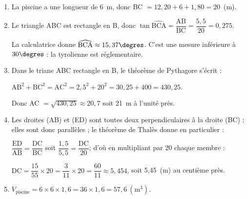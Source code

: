 \begin{enumerate}
\item %
La piscine a une longueur de 6~m, donc BC $= 12,20 + 6 + 1,80 = 20$~(m).
\item %
Le triangle ABC est rectangle en B, donc $\tan \widehat{\text{BCA}} = \dfrac{\text{AB}}{\text{BC}} = \dfrac{5,5}{20} = 0,275$.

La calculatrice donne $\widehat{\text{BCA}} \approx 15,37\degres$. C'est une mesure inférieure à $30\degres$ : la tyrolienne est réglementaire.
\item %
Dans le triane ABC rectangle en B, le théorème de Pythagore s'écrit :

$\text{AB}^2 + \text{BC}^2 = \text{AC}^2 = 2,5^2 + 20^2 = 30,25 + 400 = 430,25$.

Donc AC $= \sqrt{430,25} \approx 20,7$ soit 21~m à l'unité près.
\item %
Les droites (AB) et (ED) sont toutes deux perpendiculaires à la droite (BC) : elles sont donc parallèles  ; le théorème de Thalès donne en particulier :

$\dfrac{\text{ED}}{\text{AB}} = \dfrac{\text{DC}}{\text{BC}}$ soit $\dfrac{1,5}{5,5} = \dfrac{\text{DC}}{20}$; d'où en multipliant par 20 chaque membre :

$\text{DC} = \dfrac{15}{55} \times 20  = \dfrac{3}{11} \times 20 = \dfrac{60}{11} \approx 5,454$, soit 5,45~(m) au centième près. 
\item  %

$V_{\text{piscine}} = 6 \times 6 \times 1,6 = 36 \times 1,6 = 57,6~\left(\text{m}^3\right)$.
\end{enumerate}

